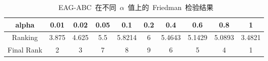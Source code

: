 
\begin{table*}[!ht]
  \centering
  \caption{~EAG-ABC~在不同~$\alpha$~值上的~Friedman~检验结果}
  \scriptsize
    \begin{tabular}{|c|c|c|c|c|c|c|c|c|c|}
    \hline
    alpha & 0.01  & 0.02  & 0.05  & 0.1   & 0.2   & 0.4   & 0.6   & 0.8   & 1 \\	\hline
    Ranking & 3.875 & 4.625 & 5.5   & 5.8214 & 6     & 5.4643 & 5.1429 & 5.0893 & 3.4821 \\	\hline
    Final Rank & 2     & 3     & 7     & 8     & 9     & 6     & 5     & 4     & 1 \\	
    \hline
    \end{tabular}%
  \label{tab:AG_parameter_alpha}%
\end{table*}%

